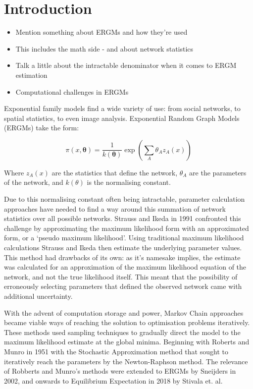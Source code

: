 \section{Introduction}
\label{introduction}
\begin{itemize}
\item Mention something about ERGMs and how they're used
\item This includes the math side - and about network statistics
\item Talk a little about the intractable denominator when it comes to ERGM estimation
\item Computational challenges in ERGMs
\end{itemize}
Exponential family models find a wide variety of use: from social networks, to spatial statistics, to even image analysis. Exponential Random Graph Models (ERGMs) take the form:

\begin{equation}
\pi(x, \boldsymbol{\theta}) = \frac{1}{k(\boldsymbol{\theta})}\exp{\left(\sum_A{\theta_Az_A(x)}\right)}
\end{equation}

Where $z_A(x)$ are the statistics that define the network, $\theta_A$ are the parameters of the network, and $k(\theta)$ is the normalising constant. 

Due to this normalising constant often being intractable, parameter calculation approaches have needed to find a way around this summation of network statistics over all possible networks. Strauss and Ikeda in 1991 confronted this challenge by approximating the maximum likelihood form with an approximated form, or a `pseudo maximum likelihood'. Using traditional maximum likelihood calculations Strauss and Ikeda then estimate the underlying parameter values. This method had drawbacks of its own: as it's namesake implies, the estimate was calculated for an approximation of the maximum likelihood equation of the network, and not the true likelihood itself. This meant that the possibility of erroneously selecting parameters that defined the observed network came with additional uncertainty. 

With the advent of computation storage and power, Markov Chain approaches became viable ways of reaching the solution to optimisation problems iteratively. These methods used sampling techniques to gradually direct the model to the maximum likelihood estimate at the global minima. Beginning with Roberts and Munro in 1951 with the Stochastic Approximation method that sought to iteratively reach the parameters by the Newton-Raphson method. The relevance of Robberts and Munro's methods were extended to ERGMs by Sneijders in 2002, and onwards to Equilibrium Expectation in 2018 by Stivala et. al. 

